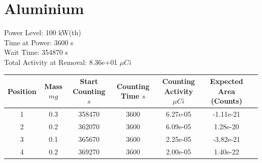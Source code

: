 \newpage

\section*{ Aluminium }

Power Level: 100 kW(th) \\
Time at Power: 3600 s \\
Wait Time: 354870 s \\
Total Activity at Removal: 8.36e+01 $\mu Ci$

\begin{table}[h]
\centering
\begin{tabular}{ |c|c|c|c|c|c|c| }
 \hline
 Position & Mass $mg$ & Start Counting $s$ & Counting Time $s$ & Counting Activity $\mu Ci$ & Expected Area (Counts) \\
 \hline 
 1 & 0.3 & 358470 & 3600 & 6.27e-05 & -1.11e-21\\ 
\hline
 2 & 0.2 & 362070 & 3600 & 6.09e-05 & 1.28e-20\\ 
\hline
 3 & 0.1 & 365670 & 3600 & 2.25e-05 & -3.82e-21\\ 
\hline
 4 & 0.2 & 369270 & 3600 & 2.00e-05 & 1.40e-22\\ 
\hline
\end{tabular}
\end{table}

